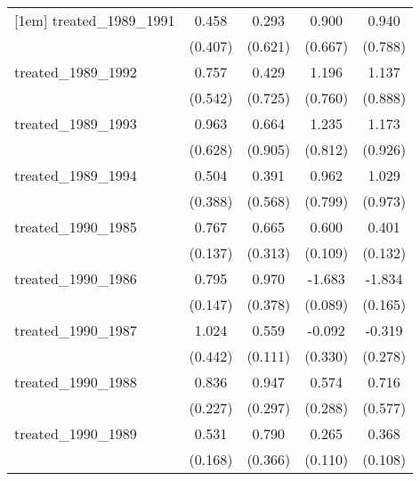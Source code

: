 {\begin{tabular}{l*{4}{c}}
[1em]
treated\_1989\_1991&       0.458         &       0.293         &       0.900         &       0.940         \\
            &     (0.407)         &     (0.621)         &     (0.667)         &     (0.788)         \\
[1em]
treated\_1989\_1992&       0.757         &       0.429         &       1.196         &       1.137         \\
            &     (0.542)         &     (0.725)         &     (0.760)         &     (0.888)         \\
[1em]
treated\_1989\_1993&       0.963         &       0.664         &       1.235         &       1.173         \\
            &     (0.628)         &     (0.905)         &     (0.812)         &     (0.926)         \\
[1em]
treated\_1989\_1994&       0.504         &       0.391         &       0.962         &       1.029         \\
            &     (0.388)         &     (0.568)         &     (0.799)         &     (0.973)         \\
[1em]
treated\_1990\_1985&       0.767\sym{***}&       0.665\sym{*}  &       0.600\sym{***}&       0.401\sym{**} \\
            &     (0.137)         &     (0.313)         &     (0.109)         &     (0.132)         \\
[1em]
treated\_1990\_1986&       0.795\sym{***}&       0.970\sym{*}  &      -1.683\sym{***}&      -1.834\sym{***}\\
            &     (0.147)         &     (0.378)         &     (0.089)         &     (0.165)         \\
[1em]
treated\_1990\_1987&       1.024\sym{*}  &       0.559\sym{***}&      -0.092         &      -0.319         \\
            &     (0.442)         &     (0.111)         &     (0.330)         &     (0.278)         \\
[1em]
treated\_1990\_1988&       0.836\sym{***}&       0.947\sym{**} &       0.574\sym{*}  &       0.716         \\
            &     (0.227)         &     (0.297)         &     (0.288)         &     (0.577)         \\
[1em]
treated\_1990\_1989&       0.531\sym{**} &       0.790\sym{*}  &       0.265\sym{*}  &       0.368\sym{***}\\
            &     (0.168)         &     (0.366)         &     (0.110)         &     (0.108)         \\

\end{tabular}}
